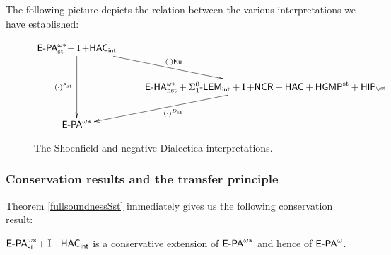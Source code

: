 The following picture depicts the relation between the various interpretations we have established:
\begin{figure}[hbt]%
\[
\begin{xy}
  \xymatrix{
      \epaststar + \I + \HAC_\intern \ar[rd]^{(\cdot)\ku} \ar[dd]_{(\cdot)^\Sh} &  \\
      {} & \ehanststar+\LEM_\intern+\I+\NCR + \HAC + \HGMP + \HIP_{\forallst} \ar[ld]^{(\cdot)^\D}  \\
                                   \epastar &   {}
  }
\end{xy}\]
\caption{The Shoenfield and negative Dialectica interpretations.}
\label{f:ShD}
\end{figure}

\subsubsection*{Conservation results and the transfer principle}

Theorem \ref{fullsoundnessSst} immediately gives us the following conservation result:

\begin{cor}
${\textsf{\upshape E-PA}}^{\omega*}_{\operatorname{st}{}}\! + \operatorname{I} + {\textsf{\upshape HAC}}_{{\textsf{\upshape int}}}$ is a conservative extension of ${\textsf{\upshape E-PA}}^{\omega*}$ and hence of ${\textsf{\upshape E-PA}}^\omega$.
\end{cor}
